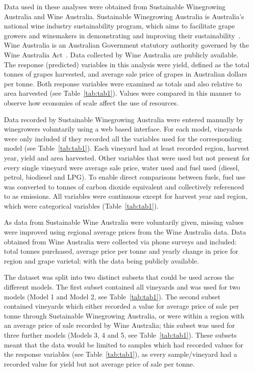 \documentclass[10pt,letterpaper]{article}
\begin{document}
Data used in these analyses were obtained from Sustainable Winegrowing Australia and Wine Australia. Sustainable Winegrowing Australia is Australia's national wine industry sustainability program, which aims to facilitate grape  growers and winemakers in demonstrating and improving their sustainability~\cite{swaSustainableWingrowingAustralia2022}. Wine Australia is an Australian Government statutory authority governed by the Wine Australia Act~\cite{attorney-generalsdepartmentWineAustraliaCorporation2010}. Data collected by Wine Australia are publicly available. The response (predicted) variables in this analysis were yield, defined as the total tonnes of grapes harvested, and average sale price of grapes in Australian dollars per tonne. Both response variables were examined as totals and also relative to area harvested (see Table~\ref{tab:tab1}). Values were compared in this manner to observe how economies of scale affect the use of resources.
\par
Data recorded by Sustainable Winegrowing Australia were entered manually by winegrowers voluntarily using a web based interface. For each model, vineyards were only included if they recorded all the variables used for the corresponding model (see Table~\ref{tab:tab1}). Each vineyard had at least recorded region, harvest year, yield and area harvested. Other variables that were used but not present for every single vineyard were average sale price, water used and fuel used (diesel, petrol, biodiesel and LPG). To enable direct comparisons between fuels, fuel use was converted to tonnes of carbon dioxide equivalent and collectively referenced to as emissions. All variables were continuous except for harvest year and region, which were categorical variables (Table~\ref{tab:tab1}).
\par
As data from Sustainable Wine Australia were voluntarily given, missing values were improved using regional average prices from the Wine Australia data. Data obtained from Wine Australia were collected via phone surveys and included: total tonnes purchased, average price per tonne and yearly change in price for region and grape varietal; with the data being publicly available.
\par
The dataset was split into two distinct subsets that could be used across the different models. The first subset contained all vineyards and was used for two models (Model 1 and Model 2, see Table~\ref{tab:tab1}). The second subset contained vineyards which either recorded a value for average price of sale per tonne through Sustainable Winegrowing Australia, or were within a region with an average price of sale recorded by Wine Australia; this subset was used for three further models (Models 3, 4 and 5, see Table~\ref{tab:tab1}). These subsets meant that the data would be limited to samples which had recorded values for the response variables (see Table~\ref{tab:tab1}), as every sample/vineyard had a recorded value for yield but not average price of sale per tonne.
\end{document}
